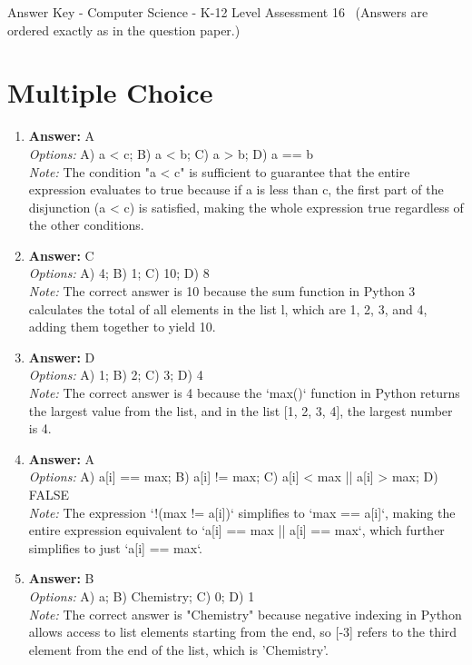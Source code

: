 \documentclass[12pt]{article}
\begin{document}
\begin{center}
Answer Key - Computer Science - K-12 Level Assessment 16 \
\small (Answers are ordered exactly as in the question paper.)
\end{center}

\section*{Multiple Choice}
\begin{enumerate}[label=\arabic*.]
\item \textbf{Answer:} A
\\ \textit{Options:} A) a \textless{} c; B) a \textless{} b; C) a \textgreater{} b; D) a == b
\\ \textit{Note:} The condition "a \textless{} c" is sufficient to guarantee that the entire expression evaluates to true because if a is less than c, the first part of the disjunction (a \textless{} c) is satisfied, making the whole expression true regardless of the other conditions.
\item \textbf{Answer:} C
\\ \textit{Options:} A) 4; B) 1; C) 10; D) 8
\\ \textit{Note:} The correct answer is 10 because the sum function in Python 3 calculates the total of all elements in the list l, which are 1, 2, 3, and 4, adding them together to yield 10.
\item \textbf{Answer:} D
\\ \textit{Options:} A) 1; B) 2; C) 3; D) 4
\\ \textit{Note:} The correct answer is 4 because the `max()` function in Python returns the largest value from the list, and in the list [1, 2, 3, 4], the largest number is 4.
\item \textbf{Answer:} A
\\ \textit{Options:} A) a[i] == max; B) a[i] != max; C) a[i] \textless{} max || a[i] \textgreater{} max; D) FALSE
\\ \textit{Note:} The expression `!(max != a[i])` simplifies to `max == a[i]`, making the entire expression equivalent to `a[i] == max || a[i] == max`, which further simplifies to just `a[i] == max`.
\item \textbf{Answer:} B
\\ \textit{Options:} A) a; B) Chemistry; C) 0; D) 1
\\ \textit{Note:} The correct answer is "Chemistry" because negative indexing in Python allows access to list elements starting from the end, so [-3] refers to the third element from the end of the list, which is 'Chemistry'.
\end{enumerate}
\end{document}
